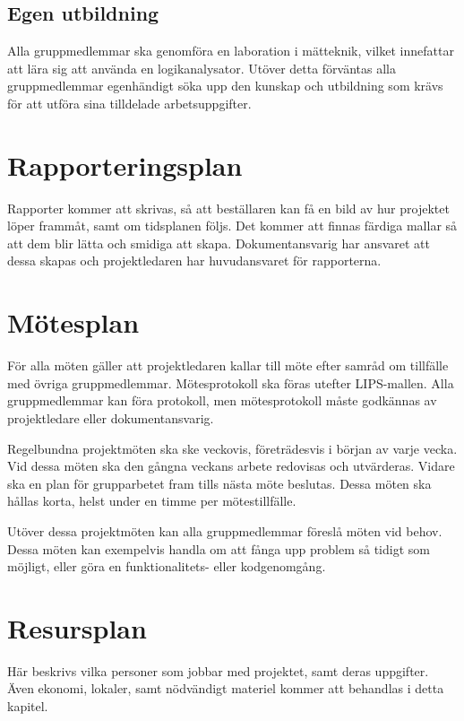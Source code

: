 \documentclass[a4paper,11pt]{article}
\begin{document}
\subsection{Egen utbildning}
Alla gruppmedlemmar ska genomföra en laboration i mätteknik, vilket innefattar att lära sig att använda en logikanalysator. Utöver detta förväntas alla gruppmedlemmar egenhändigt söka upp den kunskap och utbildning som krävs för att utföra sina tilldelade arbetsuppgifter.

\section{Rapporteringsplan}
Rapporter kommer att skrivas, så att beställaren kan få en bild av hur projektet löper frammåt, samt om tidsplanen följs. Det kommer att finnas färdiga mallar så att dem blir lätta och smidiga att skapa. Dokumentansvarig har ansvaret att dessa skapas och projektledaren har huvudansvaret för rapporterna. %

\section{Mötesplan}
För alla möten gäller att projektledaren kallar till möte efter samråd om tillfälle med övriga gruppmedlemmar. Mötesprotokoll ska föras utefter LIPS-mallen. Alla gruppmedlemmar kan föra protokoll, men mötesprotokoll måste godkännas av projektledare eller dokumentansvarig.

Regelbundna projektmöten ska ske veckovis, företrädesvis i början av varje vecka. Vid dessa möten ska den gångna veckans arbete redovisas och utvärderas. Vidare ska en plan för grupparbetet fram tills nästa möte beslutas. Dessa möten ska hållas korta, helst under en timme per mötestillfälle. 

Utöver dessa projektmöten kan alla gruppmedlemmar föreslå möten vid behov. Dessa möten kan exempelvis handla om att fånga upp problem så tidigt som möjligt, eller göra en funktionalitets- eller kodgenomgång.

\section{Resursplan}
Här beskrivs vilka personer som jobbar med projektet, samt deras uppgifter. Även ekonomi, lokaler, samt nödvändigt materiel kommer att behandlas i detta kapitel.
\end{document}
